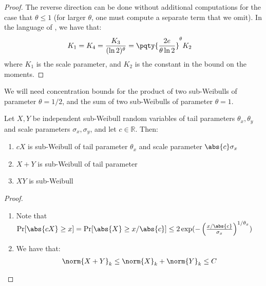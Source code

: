 \begin{proof}
The reverse direction can be done without additional computations for the case that $\theta\leq 1$ (for larger $\theta$, one must compute a separate term that we omit).
In the language of \cite{sub-weibull}, we have that:
\begin{align*}
K_1 &= K_4 = \frac{K_3}{(\ln 2)^\theta} = \pqty{\frac{2e}{\theta \ln 2}}^\theta K_2
\end{align*}
where $K_1$ is the scale parameter, and $K_2$ is the constant in the bound on the moments.
\end{proof}


We will need concentration bounds for the product of two sub-Weibulls of parameter $\theta = 1/2$, and the sum of two sub-Weibulls of parameter $\theta = 1$.
\begin{lemma}
	Let $X, Y$ be independent sub-Weibull random variables of tail parameters $\theta_x, \theta_y$ and scale parameters $\sigma_x, \sigma_y$, and let $c\in\mathbb{R}$.
	Then:
	\begin{enumerate}
		\item $cX$ is sub-Weibull of tail parameter $\theta_x$ and scale parameter $\abs{c}\sigma_x$
		\item $X+Y$ is sub-Weibull of tail parameter 
		\item $XY$ is sub-Weibull
	\end{enumerate}
\end{lemma}



\begin{proof}
	\begin{enumerate}
		\item Note that $\Pr[\abs{cX} \geq x] = \Pr[\abs{X} \geq x/\abs{c}] \leq 2\exp(-\left(\frac{x/\abs{c}}{\sigma_x}\right)^{1/\theta_x})$
		\item We have that:
		\begin{align*}
		\norm{X + Y}_k \leq \norm{X}_k + \norm{Y}_k \leq C
		\end{align*}
	\end{enumerate}
\end{proof}
